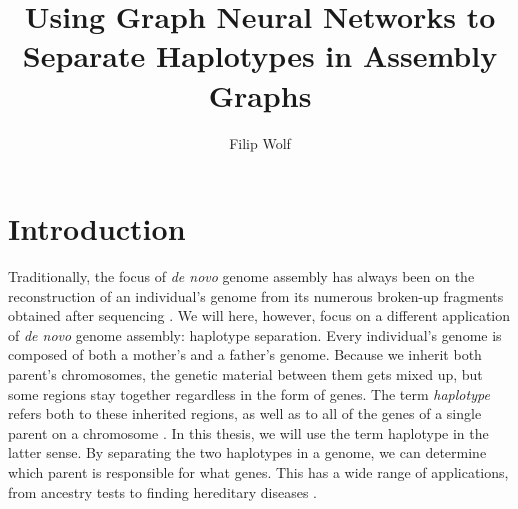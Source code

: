 \documentclass[times, utf8, diplomski, english]{fer_eng}
\begin{document}

\title{Using Graph Neural Networks to Separate Haplotypes in Assembly Graphs}

\author{Filip Wolf}

\maketitle




\tableofcontents

\chapter{Introduction}

Traditionally, the focus of \textit{de novo} genome assembly has always been on the reconstruction of an individual's genome from its numerous broken-up fragments obtained after sequencing \cite{de_novo2}. We will here, however, focus on a different application of \textit{de novo} genome assembly: haplotype separation. Every individual's genome is composed of both a mother's and a father's genome. Because we inherit both parent's chromosomes, the genetic material between them gets mixed up, but some regions stay together regardless in the form of genes. The term \textit{haplotype} refers both to these inherited regions, as well as to all of the genes of a single parent on a chromosome \cite{haplotype}. In this thesis, we will use the term haplotype in the latter sense. By separating the two haplotypes in a genome, we can determine which parent is responsible for what genes. This has a wide range of applications, from ancestry tests to finding hereditary diseases \cite{haplotype_usage}.         
\end{document}
